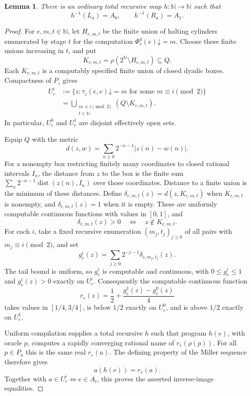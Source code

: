 \documentclass[11pt]{article}
\newtheorem{lemma}[theorem]{Lemma}
\newcommand{\N}{\mathbb N}
\begin{document}
\begin{lemma}\label{lem:miller-cut-reduction}
There is an ordinary total recursive map $h:\N\to\N$ such that
\[
 h^{-1}(L_a)=A_0,\qquad h^{-1}(R_a)=A_1.
\]
\end{lemma}
\begin{proof}
For $e,m,t\in\N$, let $H_{e,m,t}$ be the finite union of halting
cylinders enumerated by stage $t$ for the computation
$\Phi_e^q(e)\mathord\downarrow=m$. Choose these finite unions increasing
in $t$, and put
\[
 K_{e,m,t}=\rho(2^{\N}\setminus H_{e,m,t})\subseteq Q.
\]
Each $K_{e,m,t}$ is a computably specified finite union of closed dyadic
boxes. Compactness of $P_z$ gives
\begin{align*}
 U_e^i
 &:=\{z:\tau_z(e,e)\mathord\downarrow=m
                      \text{ for some }m\equiv i\pmod2\}\\
 &=\bigcup_{\substack{m\equiv i\pmod2\\t\in\N}}
       (Q\setminus K_{e,m,t}).
\end{align*}
In particular, $U_e^0$ and $U_e^1$ are disjoint effectively open sets.

Equip $Q$ with the metric
\[
 d(z,w)=\sum_{n\geq0}2^{-n-1}|z(n)-w(n)|.
\]
For a nonempty box restricting finitely many coordinates to closed
rational intervals $I_n$, the distance from $z$ to the box is the
finite sum
$\sum_n2^{-n-1}\operatorname{dist}(z(n),I_n)$ over those coordinates.
Distance to a finite union is the minimum of these distances. Define
$\delta_{e,m,t}(z)=d(z,K_{e,m,t})$ when $K_{e,m,t}$ is nonempty, and
$\delta_{e,m,t}(z)=1$ when it is empty. These are uniformly computable
continuous functions with values in $[0,1]$, and
\[
 \delta_{e,m,t}(z)>0\quad\Longleftrightarrow\quad
 z\notin K_{e,m,t}.
\]
For each $i$, take a fixed recursive enumeration
$(m_j,t_j)_{j\geq0}$ of all pairs with $m_j\equiv i\pmod2$, and set
\[
 g_e^i(z)=\sum_{j\geq0}2^{-j-1}\delta_{e,m_j,t_j}(z).
\]
The tail bound is uniform, so $g_e^i$ is computable and continuous,
with $0\leq g_e^i\leq1$ and $g_e^i(z)>0$ exactly on $U_e^i$.
Consequently the computable continuous function
\[
 r_e(z)=\frac12+\frac{g_e^1(z)-g_e^0(z)}4
\]
takes values in $[1/4,3/4]$, is below $1/2$ exactly on $U_e^0$, and
is above $1/2$ exactly on $U_e^1$.

Uniform compilation supplies a total recursive $h$ such that program
$h(e)$, with oracle $p$, computes a rapidly converging rational name
of $r_e(\rho(p))$. For all $p\in P_a$ this is the same real $r_e(a)$.
The defining property of the Miller sequence therefore gives
\[
 a(h(e))=r_e(a).
\]
Together with $a\in U_e^i\Longleftrightarrow e\in A_i$, this proves
the asserted inverse-image equalities.
\end{proof}
\end{document}

